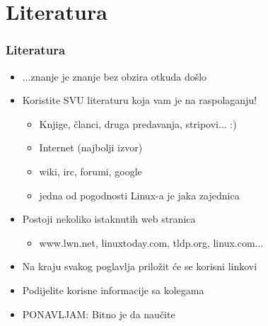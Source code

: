 \documentclass{beamer}
\begin{document}
\section{Literatura}
\begin{frame}[t]
\frametitle{Literatura}
\begin{itemize}
	\item ...znanje je znanje bez obzira otkuda došlo
	\item Koristite SVU literaturu koja vam je na raspolaganju!
	\begin{itemize}
		\item Knjige, članci, druga predavanja, stripovi... :)
		\item Internet (najbolji izvor)
		\item wiki, irc, forumi, google 
		\item jedna od pogodnosti Linux-a je jaka zajednica
	\end{itemize}
	\item Postoji nekoliko istaknutih web stranica
	\begin{itemize}
		\item www.lwn.net, linuxtoday.com, tldp.org, linux.com...
	\end{itemize}
	\item Na kraju svakog poglavlja priložit će se korisni linkovi
	\item Podijelite korisne informacije sa kolegama
	\item PONAVLJAM: Bitno je da naučite
\end{itemize}
\end{frame}
\end{document}
